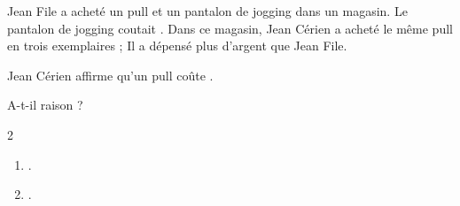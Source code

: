 \begin{exercice*}
    Jean File a acheté un pull et un pantalon de jogging dans un magasin.
    Le pantalon de jogging coutait . Dans ce magasin, Jean Cérien a acheté le même 
    pull en trois exemplaires ; Il a dépensé plus d'argent que Jean File.

    Jean Cérien affirme qu'un pull coûte .

    A-t-il raison ?
\end{exercice*}
\begin{corrige}
    \phantom{rrr}    
    \begin{multicols}2
        \begin{enumerate}
            \item .
            \item .
        \end{enumerate}
    \end{multicols}
\end{corrige}

